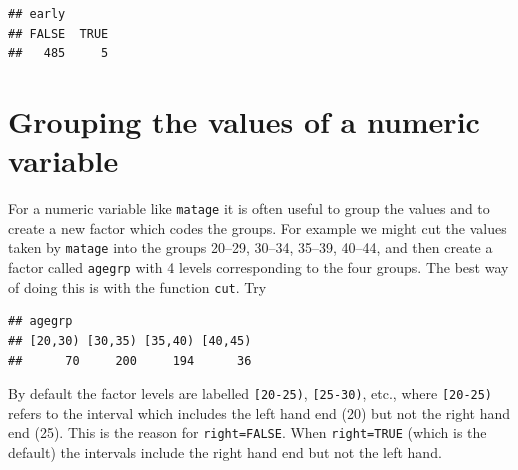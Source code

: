 \documentclass[
]{book}
\newenvironment{Shaded}{\begin{snugshade}}{\end{snugshade}}
\newcommand{\AttributeTok}[1]{\textcolor[rgb]{0.13,0.29,0.53}{#1}}
\newcommand{\ConstantTok}[1]{\textcolor[rgb]{0.56,0.35,0.01}{#1}}
\newcommand{\DecValTok}[1]{\textcolor[rgb]{0.00,0.00,0.81}{#1}}
\newcommand{\FunctionTok}[1]{\textcolor[rgb]{0.13,0.29,0.53}{\textbf{#1}}}
\newcommand{\NormalTok}[1]{#1}
\newcommand{\OtherTok}[1]{\textcolor[rgb]{0.56,0.35,0.01}{#1}}
\newcommand{\SpecialCharTok}[1]{\textcolor[rgb]{0.81,0.36,0.00}{\textbf{#1}}}
\theoremstyle{definition}
\theoremstyle{definition}
\theoremstyle{definition}
\theoremstyle{definition}
\theoremstyle{remark}
\begin{document}
\begin{Shaded}
\end{Shaded}

\begin{verbatim}
## early
## FALSE  TRUE 
##   485     5
\end{verbatim}

\section{Grouping the values of a numeric variable}\label{grouping-the-values-of-a-numeric-variable}

For a numeric variable like \texttt{matage} it is often useful
to group the values and to create a new factor which codes the groups.
For example we might cut the values taken by \texttt{matage} into the
groups 20--29, 30--34, 35--39, 40--44, and then create a factor called
\texttt{agegrp} with 4 levels corresponding to the four groups. The best way of doing this is
with the function \texttt{cut}. Try

\begin{Shaded}
\end{Shaded}

\begin{verbatim}
## agegrp
## [20,30) [30,35) [35,40) [40,45) 
##      70     200     194      36
\end{verbatim}

By default the factor levels are labelled \texttt{{[}20-25)},
\texttt{{[}25-30)}, etc., where \texttt{{[}20-25)} refers to the interval
which includes the left hand end (20) but not the right hand end
(25). This is the reason for \texttt{right=FALSE}. When \texttt{right=TRUE}
(which is the default) the intervals include the right hand end but
not the left hand.
\end{document}
